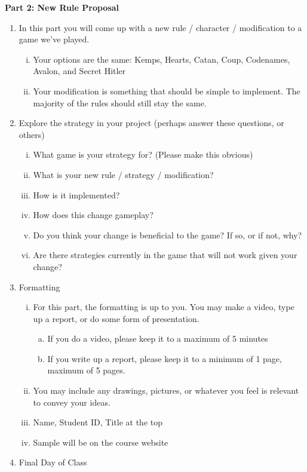 \documentclass[11.5pt]{article}
\begin{document}
\newpage
\noindent\textbf{Part 2: New Rule Proposal} 
\begin{enumerate}
\setlength{\itemsep}{3pt}
\item In this part you will come up with a new rule / character / modification to a game we've played.
	\begin{enumerate}[(i)]
	\item Your options are the same: Kemps, Hearts, Catan, Coup, Codenames, Avalon, and Secret Hitler
	\item Your modification is something that should be simple to implement. The majority of the rules should still stay the same.
	\end{enumerate}
\item Explore the strategy in your project (perhaps answer these questions, or others)
	\begin{enumerate}[(i)]
	\item What game is your strategy for? (Please make this obvious)
	\item What is your new rule / strategy / modification?
	\item How is it implemented?
	\item How does this change gameplay?
	\item Do you think your change is beneficial to the game? If so, or if not, why?
	\item Are there strategies currently in the game that will not work given your change?
	\end{enumerate}
\item Formatting
	\begin{enumerate}[(i)]
	\item For this part, the formatting is up to you. You may make a video, type up a report, or do some form of presentation.
		\begin{enumerate}[(a)]
		\item If you do a video, please keep it to a maximum of 5 minutes
		\item If you write up a report, please keep it to a minimum of 1 page, maximum of 5 pages.
		\end{enumerate}
	\item You may include any drawings, pictures, or whatever you feel is relevant to convey your ideas.
	\item Name, Student ID, Title at the top
	\item Sample will be on the course website
	\end{enumerate}
\item Final Day of Class

\end{enumerate}
\end{document}
